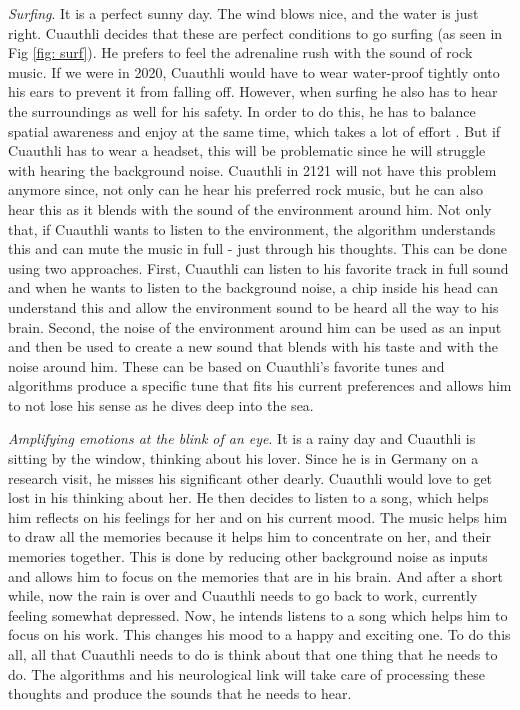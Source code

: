 \documentclass[sigchi]{acmart}
\begin{document}
\textit{Surfing}. It is a perfect sunny day. The wind blows nice, and the water is just right. Cuauthli decides that these are perfect conditions to go surfing (as seen in Fig \ref{fig: surf}). He prefers to feel the adrenaline rush with the sound of rock music. If we were in 2020, Cuauthli would have to wear water-proof tightly onto his ears to prevent it from falling off. However, when surfing he also has to hear the surroundings as well for his safety. 
In order to do this, he has to balance spatial awareness and enjoy at the same time, which takes a lot of effort \cite{fuchs2018dancing}. But if Cuauthli has to wear a headset, this will be problematic since he will struggle with hearing the background noise. Cuauthli in 2121 will not have this problem anymore since, not only can he hear his preferred rock music, but he can also hear this as it blends with the sound of the environment around him. Not only that, if Cuauthli wants to listen to the environment, the algorithm understands this and can mute the music in full - just through his thoughts. This can be done using two approaches. First, Cuauthli can listen to his favorite track in full sound and when he wants to listen to the background noise, a chip inside his head can understand this and allow the environment sound to be heard all the way to his brain. Second, the noise of the environment around him can be used as an input and then be used to create a new sound that blends with his taste and with the noise around him. These can be based on Cuauthli's favorite tunes and algorithms produce a specific tune that fits his current preferences and allows him to not lose his sense as he dives deep into the sea. 

\textit{Amplifying emotions at the blink of an eye}. It is a rainy day and Cuauthli is sitting by the window, thinking about his lover. Since he is in Germany on a research visit, he misses his significant other dearly. Cuauthli would love to get lost in his thinking about her. He then decides to listen to a song, which helps him reflects on his feelings for her and on his current mood. The music helps him to draw all the memories because it helps him to concentrate on her, and their memories together. This is done by reducing other background noise as inputs and allows him to focus on the memories that are in his brain. And after a short while, now the rain is over and Cuauthli needs to go back to work, currently feeling somewhat depressed. Now, he intends listens to a song which helps him to focus on his work. This changes his mood to a happy and exciting one. To do this all, all that Cuauthli needs to do is think about that one thing that he needs to do. The algorithms and his neurological link will take care of processing these thoughts and produce the sounds that he needs to hear. 
\end{document}
